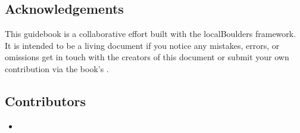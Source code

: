 \begin{multicols}{2}
\raggedcolumns

\section{Acknowledgements}
This guidebook is a collaborative effort built with the localBoulders framework. It is intended to be a living document if you notice any mistakes, errors, or omissions get in touch with the creators of this document or submit your own contribution via the book's .
\subsection*{Contributors}
\begin{itemize}
\item {}
\end{itemize}
\end{multicols}
\clearpage